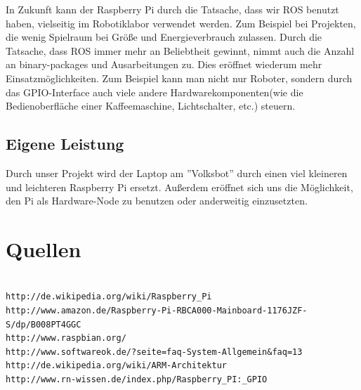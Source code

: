 \documentclass[12pt]{article}
\begin{document}
In Zukunft kann der Raspberry Pi durch die Tatsache, dass wir ROS benutzt haben, vielseitig im Robotiklabor verwendet werden. Zum Beispiel bei Projekten, die wenig Spielraum bei Größe und Energieverbrauch zulassen.
Durch die Tatsache, dass ROS immer mehr an Beliebtheit gewinnt, nimmt auch die Anzahl an binary-packages und Ausarbeitungen zu. Dies eröffnet wiederum mehr Einsatzmöglichkeiten.
Zum Beispiel kann man nicht nur Roboter, sondern durch das GPIO-Interface auch viele andere Hardwarekomponenten(wie die Bedienoberfläche einer Kaffeemaschine, Lichtschalter, etc.) steuern.  


\subsection{Eigene Leistung}

Durch unser Projekt wird der Laptop am ''Volksbot'' durch einen viel kleineren und leichteren Raspberry Pi ersetzt. Außerdem eröffnet sich uns die Möglichkeit, den Pi als Hardware-Node zu benutzen oder anderweitig einzusetzten.

\section{Quellen}
\begin{verbatim}

http://de.wikipedia.org/wiki/Raspberry_Pi
http://www.amazon.de/Raspberry-Pi-RBCA000-Mainboard-1176JZF-S/dp/B008PT4GGC
http://www.raspbian.org/
http://www.softwareok.de/?seite=faq-System-Allgemein&faq=13
http://de.wikipedia.org/wiki/ARM-Architektur
http://www.rn-wissen.de/index.php/Raspberry_PI:_GPIO

\end{verbatim}
\end{document}
